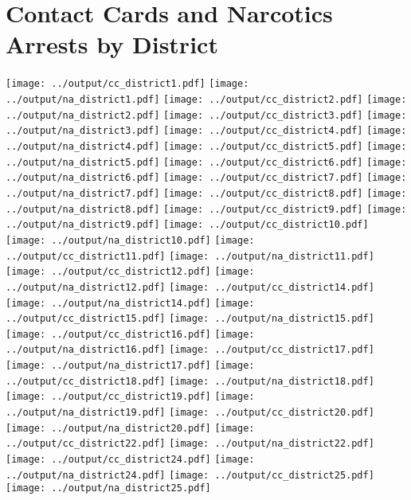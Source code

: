\documentclass[]{article}
\begin{document}
\section*{Contact Cards and Narcotics Arrests by District}
\texttt{[image: ../output/cc\_district1.pdf]}
\texttt{[image: ../output/na\_district1.pdf]}
\texttt{[image: ../output/cc\_district2.pdf]}
\texttt{[image: ../output/na\_district2.pdf]}
\texttt{[image: ../output/cc\_district3.pdf]}
\texttt{[image: ../output/na\_district3.pdf]}
\texttt{[image: ../output/cc\_district4.pdf]}
\texttt{[image: ../output/na\_district4.pdf]}
\texttt{[image: ../output/cc\_district5.pdf]}
\texttt{[image: ../output/na\_district5.pdf]}
\texttt{[image: ../output/cc\_district6.pdf]}
\texttt{[image: ../output/na\_district6.pdf]}
\texttt{[image: ../output/cc\_district7.pdf]}
\texttt{[image: ../output/na\_district7.pdf]}
\texttt{[image: ../output/cc\_district8.pdf]}
\texttt{[image: ../output/na\_district8.pdf]}
\texttt{[image: ../output/cc\_district9.pdf]}
\texttt{[image: ../output/na\_district9.pdf]}
\texttt{[image: ../output/cc\_district10.pdf]}
\texttt{[image: ../output/na\_district10.pdf]}
\texttt{[image: ../output/cc\_district11.pdf]}
\texttt{[image: ../output/na\_district11.pdf]}
\texttt{[image: ../output/cc\_district12.pdf]}
\texttt{[image: ../output/na\_district12.pdf]}
\texttt{[image: ../output/cc\_district14.pdf]}
\texttt{[image: ../output/na\_district14.pdf]}
\texttt{[image: ../output/cc\_district15.pdf]}
\texttt{[image: ../output/na\_district15.pdf]}
\texttt{[image: ../output/cc\_district16.pdf]}
\texttt{[image: ../output/na\_district16.pdf]}
\texttt{[image: ../output/cc\_district17.pdf]}
\texttt{[image: ../output/na\_district17.pdf]}
\texttt{[image: ../output/cc\_district18.pdf]}
\texttt{[image: ../output/na\_district18.pdf]}
\texttt{[image: ../output/cc\_district19.pdf]}
\texttt{[image: ../output/na\_district19.pdf]}
\texttt{[image: ../output/cc\_district20.pdf]}
\texttt{[image: ../output/na\_district20.pdf]}
\texttt{[image: ../output/cc\_district22.pdf]}
\texttt{[image: ../output/na\_district22.pdf]}
\texttt{[image: ../output/cc\_district24.pdf]}
\texttt{[image: ../output/na\_district24.pdf]}
\texttt{[image: ../output/cc\_district25.pdf]}
\texttt{[image: ../output/na\_district25.pdf]}
\end{document}
